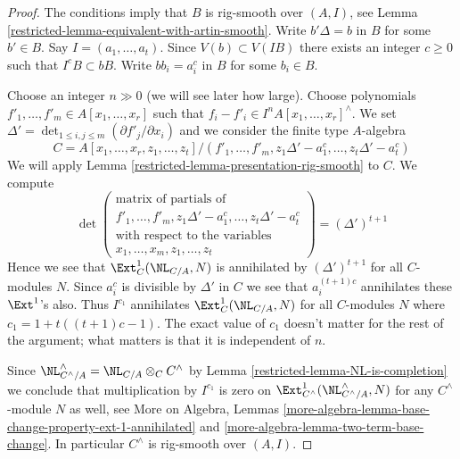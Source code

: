 \begin{proof}

The conditions imply that $B$ is rig-smooth over $(A, I)$, see
Lemma \ref{restricted-lemma-equivalent-with-artin-smooth}.
Write $b' \Delta = b$ in $B$ for some $b' \in B$.
Say $I = (a_1, \ldots, a_t)$. Since $V(b) \subset V(IB)$ there
exists an integer $c \geq 0$ such that $I^cB \subset bB$.
Write $bb_i = a_i^c$ in $B$ for some $b_i \in B$.

\medskip\noindent
Choose an integer $n \gg 0$ (we will see later how large).
Choose polynomials $f'_1, \ldots, f'_m \in A[x_1, \ldots, x_r]$
such that $f_i - f'_i \in I^nA[x_1, \ldots, x_r]^\wedge$.
We set $\Delta' = \det_{1 \leq i, j \leq m}(\partial f'_j/\partial x_i)$
and we consider the finite type $A$-algebra
$$
C = A[x_1, \ldots, x_r, z_1, \ldots, z_t]/
(f'_1, \ldots, f'_m,
z_1\Delta' - a_1^c, \ldots, z_t\Delta' - a_t^c)
$$
We will apply Lemma \ref{restricted-lemma-presentation-rig-smooth} to $C$.
We compute
$$
\det\left(
\begin{matrix}
\text{matrix of partials of} \\
f'_1, \ldots, f'_m, z_1\Delta' - a_1^c, \ldots, z_t\Delta' - a_t^c \\
\text{with respect to the variables} \\
x_1, \ldots, x_m, z_1, \ldots, z_t
\end{matrix}
\right) =
(\Delta')^{t + 1}
$$
Hence we see that $\Ext^1_C(\NL_{C/A}, N)$ is annihilated by
$(\Delta')^{t + 1}$ for all $C$-modules $N$. Since $a_i^c$ is
divisible by $\Delta'$ in $C$ we see that $a_i^{(t + 1)c}$ annihilates
these $\Ext^1$'s also. Thus $I^{c_1}$ annihilates
$\Ext^1_C(\NL_{C/A}, N)$ for all $C$-modules $N$
where $c_1 = 1 + t((t + 1)c - 1)$. The exact value of $c_1$ doesn't matter for
the rest of the argument; what matters is that it is independent of $n$.

\medskip\noindent
Since $\NL_{C^\wedge/A}^\wedge = \NL_{C/A} \otimes_C C^\wedge$ by
Lemma \ref{restricted-lemma-NL-is-completion} we conclude that multiplication
by $I^{c_1}$ is zero on $\Ext^1_{C^\wedge}(\NL_{C^\wedge/A}^\wedge, N)$
for any $C^\wedge$-module $N$ as well, see
More on Algebra, Lemmas
\ref{more-algebra-lemma-base-change-property-ext-1-annihilated} and
\ref{more-algebra-lemma-two-term-base-change}.
In particular $C^\wedge$ is rig-smooth over $(A, I)$.


\end{proof}
